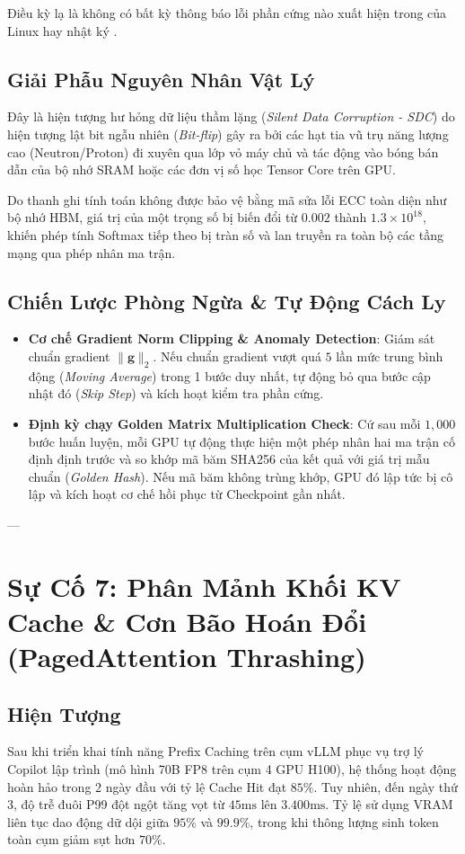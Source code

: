 Điều kỳ lạ là không có bất kỳ thông báo lỗi phần cứng nào xuất hiện trong  của Linux hay nhật ký .

\subsection{Giải Phẫu Nguyên Nhân Vật Lý}
Đây là hiện tượng hư hỏng dữ liệu thầm lặng (\textit{Silent Data Corruption - SDC}) do hiện tượng lật bit ngẫu nhiên (\textit{Bit-flip}) gây ra bởi các hạt tia vũ trụ năng lượng cao (Neutron/Proton) đi xuyên qua lớp vỏ máy chủ và tác động vào bóng bán dẫn của bộ nhớ SRAM hoặc các đơn vị số học Tensor Core trên GPU.

Do thanh ghi tính toán không được bảo vệ bằng mã sửa lỗi ECC toàn diện như bộ nhớ HBM, giá trị của một trọng số bị biến đổi từ $0.002$ thành $1.3 \times 10^{18}$, khiến phép tính Softmax tiếp theo bị tràn số và lan truyền  ra toàn bộ các tầng mạng qua phép nhân ma trận.

\subsection{Chiến Lược Phòng Ngừa \& Tự Động Cách Ly}
\begin{itemize}
  \item \textbf{Cơ chế Gradient Norm Clipping \& Anomaly Detection}: Giám sát chuẩn gradient $\|\mathbf{g}\|_2$. Nếu chuẩn gradient vượt quá $5$ lần mức trung bình động (\textit{Moving Average}) trong 1 bước duy nhất, tự động bỏ qua bước cập nhật đó (\textit{Skip Step}) và kích hoạt kiểm tra phần cứng.
  \item \textbf{Định kỳ chạy Golden Matrix Multiplication Check}: Cứ sau mỗi $1,000$ bước huấn luyện, mỗi GPU tự động thực hiện một phép nhân hai ma trận cố định định trước và so khớp mã băm SHA256 của kết quả với giá trị mẫu chuẩn (\textit{Golden Hash}). Nếu mã băm không trùng khớp, GPU đó lập tức bị cô lập và kích hoạt cơ chế hồi phục từ Checkpoint gần nhất.
\end{itemize}

---

\section{Sự Cố 7: Phân Mảnh Khối KV Cache \& Cơn Bão Hoán Đổi (PagedAttention Thrashing)}
\label{sec:postmortem-pagedattention-thrashing}

\subsection{Hiện Tượng}
Sau khi triển khai tính năng Prefix Caching trên cụm vLLM phục vụ trợ lý Copilot lập trình (mô hình 70B FP8 trên cụm 4 GPU H100), hệ thống hoạt động hoàn hảo trong 2 ngày đầu với tỷ lệ Cache Hit đạt $85\%$.
Tuy nhiên, đến ngày thứ 3, độ trễ đuôi P99 đột ngột tăng vọt từ $45\text{ms}$ lên $3.400\text{ms}$. Tỷ lệ sử dụng VRAM liên tục dao động dữ dội giữa $95\%$ và $99.9\%$, trong khi thông lượng sinh token toàn cụm giảm sụt hơn $70\%$.

